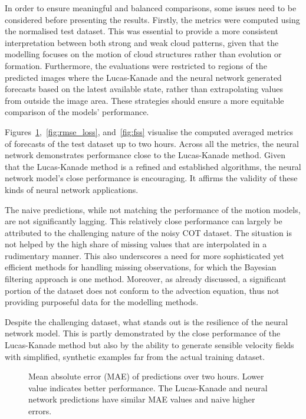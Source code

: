 In order to ensure meaningful and balanced comparisons, some issues need to be considered before presenting the results.
Firstly, the metrics were computed using the normalised test dataset.
This was essential to provide a more consistent interpretation between both strong and weak cloud patterns, given that the modelling focuses on the motion of cloud structures rather than evolution or formation.
Furthermore, the evaluations were restricted to regions of the predicted images where the Lucas-Kanade and the neural network generated forecasts based on the latest available state, rather than extrapolating values from outside the image area.
These strategies should ensure a more equitable comparison of the models' performance.

Figures~\ref{fig:mae_loss},~\ref{fig:rmse_loss}, and~\ref{fig:fss} visualise the computed averaged metrics of forecasts of the test dataset up to two hours.
Across all the metrics, the neural network demonstrates performance close to the Lucas-Kanade method.
Given that the Lucas-Kanade method is a refined and established algorithms, the neural network model's close performance is encouraging.
It affirms the validity of these kinds of neural network applications.

The naive predictions, while not matching the performance of the motion models, are not significantly lagging.
This relatively close performance can largely be attributed to the challenging nature of the noisy COT dataset.
The situation is not helped by the high share of missing values that are interpolated in a rudimentary manner.
This also underscores a need for more sophisticated yet efficient methods for handling missing observations, for which the Bayesian filtering approach is one method.
Moreover, as already discussed, a significant portion of the dataset does not conform to the advection equation, thus not providing purposeful data for the modelling methods.

Despite the challenging dataset, what stands out is the resilience of the neural network model.
This is partly demonstrated by the close performance of the Lucas-Kanade method but also by the ability to generate sensible velocity fields with simplified, synthetic examples far from the actual training dataset.

\begin{figure}[H]
    \centering
    \caption{\label{fig:mae_loss}Mean absolute error (MAE) of predictions over two hours.
    Lower value indicates better performance.
    The Lucas-Kanade and neural network predictions have similar MAE values and naive higher errors.}
\end{figure}

